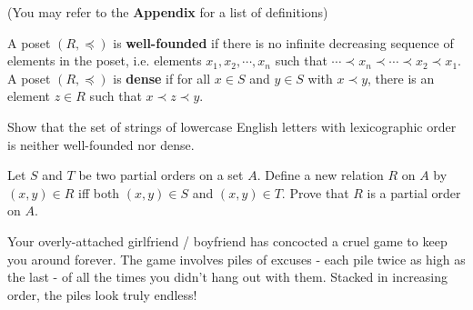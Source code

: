 \documentclass[addpoints]{exam}
\begin{document}
\begin{questions}

(You may refer to the \textbf{Appendix} for a list of definitions)


  \begin{solution}
  \end{solution}
  
\question 
A poset $(R, \preccurlyeq)$ is \textbf{well-founded} if there is no infinite decreasing sequence of elements in the poset, i.e. elements $x_1, x_2, \cdots, x_n$ such that $\cdots \prec x_n \prec \cdots  \prec x_2 \prec x_1$. A poset $(R, \preccurlyeq)$ is \textbf{dense} if for all $x \in S$ and $y \in S$ with $x \prec y$, there is an element $z \in R$ such that $x \prec z \prec y$.

Show that the set of strings of lowercase English letters with lexicographic order is neither well-founded nor dense.


  \begin{solution}
  \end{solution}

\question
     Let $S$ and $T$ be two partial orders on a set $A$. Define a new relation $R$ on $A$ by $(x,y)\in R$ iff both $(x,y) \in S$ and $(x,y) \in T$. Prove that $R$ is a partial order on $A$.

    
      \begin{solution}
  \end{solution}

\question Your overly-attached girlfriend / boyfriend has concocted a cruel game to keep you around forever. The game involves piles of excuses - each pile twice as high as the last - of all the times you didn't hang out with them. Stacked in increasing order, the piles look truly endless! 


\end{questions}
\end{document}
